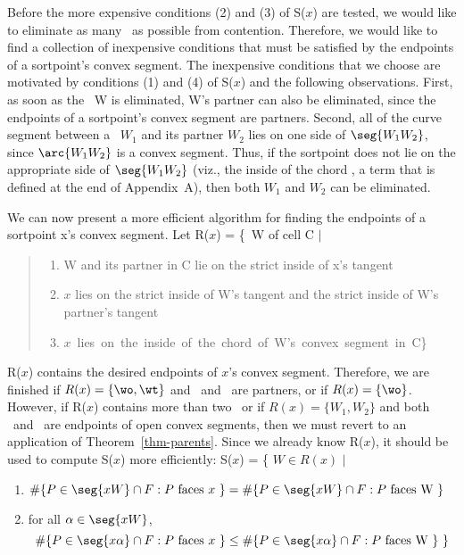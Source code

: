 Before the more expensive conditions (2) and (3) of S($x$) are tested,
we would like to eliminate as many \wallpoints\ as possible from contention.
Therefore, we would like to find a collection of inexpensive conditions
that must be satisfied by the endpoints of a sortpoint's
convex segment.
The inexpensive conditions that we choose 
are motivated by conditions (1) and (4)
of S($x$) and the following observations.
First, as soon as the \wallpoint\ W is eliminated,
W's partner can also be eliminated, since 
the endpoints of a sortpoint's convex segment are partners.
Second, all of the curve segment between a \wallpoint\ $W_{1}$ and its
partner $W_{2}$ lies on one side of $\seg{W_{1}W_{2}}$,
since $\arc{W_{1}W_{2}}$ is a convex segment.
Thus, if the sortpoint does not lie on the appropriate side of 
$\seg{W_{1}W_{2}}$ (viz., the inside of the chord \seg{\wo\wt}, a term that
is defined at the end of Appendix~A),
then both $W_{1}$ and $W_{2}$ can be eliminated.

We can now present a more efficient algorithm for
finding the endpoints of a sortpoint x's convex segment.
Let R($x$) = \{\wallpoints\ W of cell C $\mid$\nopagebreak
\begin{quote}
\begin{enumerate}
    \item W and its partner in C lie on the strict inside of x's tangent
    \item $x$ lies on the strict inside of W's tangent and the strict inside
of W's partner's tangent
    \item \mbox{$x$ lies on the inside of the chord of W's convex segment 
in C\}}
\end{enumerate}
\end{quote}
R($x$) contains the desired endpoints of $x$'s convex segment.
Therefore, we are finished if $R(x) = \{\wo,\wt\}$ and \wo\ and 
\wt\ are partners, or if $R(x) = \{\wo\}$.
However, if R($x$) contains more than two \wallpoints\ or
if $R(x) = \{ W_{1},W_{2} \}$ and both \wo\ and \wt\ are endpoints of 
open convex segments, then
we must revert to an application of Theorem~\ref{thm-parents}.
Since we already know R($x$), it should be used to compute S($x$) more 
efficiently:
S($x$) = \{ $W \in R(x)$ $\mid$\nopagebreak
\begin{enumerate}
\item \mbox{$\#\{P \in\seg{xW}\cap F: P \mbox{ faces $x$ }\} =
\#\{P \in \seg{xW}\cap F: P \mbox{ faces W \} }$}
\item
for all $\alpha \in \seg{xW}$, 
\[ \#\{P \in\seg{x\alpha}\cap F: P \mbox{ faces $x$ }\} \leq
\#\{P \in \seg{x\alpha}\cap F: P \mbox{ faces W \}\ \}} \]
\end{enumerate}

